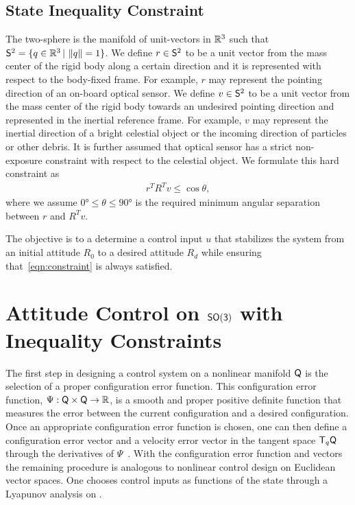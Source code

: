 \documentclass[letterpaper, 10 pt, conference]{ieeeconf}  %
\begin{document}
\subsection{State Inequality Constraint}

The two-sphere is the manifold of unit-vectors in \( \mathbb{R}^3 \) such that \( \mathsf{S}^2 = \{ q \in \mathbb{R}^3 \,  \vert \, \left\| q \right\| = 1 \}\).
We define \( r \in \mathsf{S}^2 \) to be a unit vector from the mass center of the rigid body along a certain direction and it is represented with respect to the body-fixed frame.
For example, \( r \) may represent the pointing direction of an on-board optical sensor.
We define \( v \in \mathsf{S}^2 \) to be a unit vector from the mass center of the rigid body towards an undesired pointing direction and represented in the inertial reference frame.
For example, \( v \) may represent the inertial direction of a bright celestial object or the incoming direction of particles or other debris.
It is further assumed that optical sensor has a strict non-exposure constraint with respect to the celestial object.
We formulate this hard constraint as
\begin{align}
	r^T R^T v \leq \cos \theta , \label{eqn:constraint}
\end{align}
where we assume \( \ang{0} \leq \theta \leq \ang{90}  \) is the required minimum angular separation between \( r \) and \( R^T v \). 

The objective is to a determine a control input \( u \) that stabilizes the system from an initial attitude \( R_0 \) to a desired attitude \( R_d \) while ensuring that~\cref{eqn:constraint} is always satisfied.

\section{Attitude Control on $\mathsf{SO(3)}$ with Inequality Constraints}

The first step in designing a control system on a nonlinear manifold \( \mathsf{Q} \) is the selection of a proper configuration error function. This configuration error function, \( \Psi : \mathsf{Q} \times \mathsf{Q} \to \mathbb{R} \), is a smooth and proper positive definite function that measures the error between the current configuration and a desired configuration. Once an appropriate configuration error function is chosen, one can then define a configuration error vector and a velocity error vector in the tangent space \( \mathsf{T}_q \mathsf{Q} \) through the derivatives of \( \Psi \)~\cite{bullo2004}. With the configuration error function and vectors the remaining procedure is analogous to nonlinear control design on Euclidean vector spaces. One chooses control inputs as functions of the state through a Lyapunov analysis on \Q.
\end{document}

